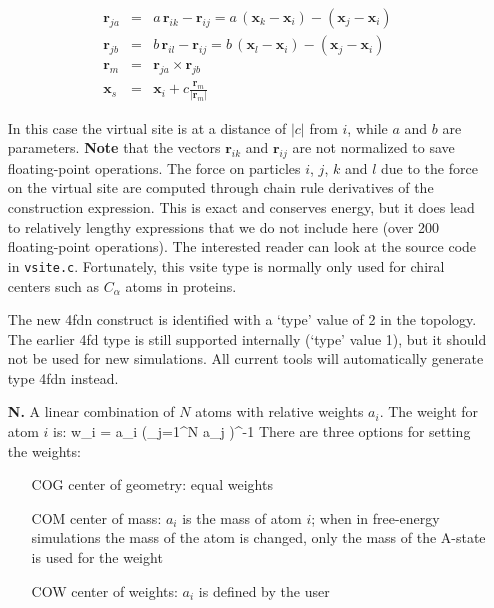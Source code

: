 \begin{itemize}
\begin{eqnarray}
\mathbf{r}_{ja} &=& a\, \mathbf{r}_{ik} - \mathbf{r}_{ij} = a\, (\mathbf{x}_k - \mathbf{x}_i) - (\mathbf{x}_j - \mathbf{x}_i) \nonumber \\
\mathbf{r}_{jb} &=& b\, \mathbf{r}_{il} - \mathbf{r}_{ij} = b\, (\mathbf{x}_l - \mathbf{x}_i) - (\mathbf{x}_j - \mathbf{x}_i) \nonumber \\
\mathbf{r}_m &=& \mathbf{r}_{ja} \times \mathbf{r}_{jb} \nonumber \\
\mathbf{x}_s &=& \mathbf{x}_i + c \frac{\mathbf{r}_m}{|\mathbf{r}_m|}
\label{eq:vsite}
\end{eqnarray}

        In this case the virtual site is at a distance of $|c|$ from $i$, while $a$ and $b$ are 
        parameters. {\bf Note} that the vectors $\mathbf{r}_{ik}$ and $\mathbf{r}_{ij}$ are not normalized
        to save floating-point operations.
        The force on particles $i$, $j$, $k$ and $l$ due to the force 
        on the virtual site are computed through chain rule derivatives
        of the construction expression. This is exact and conserves energy,
        but it does lead to relatively lengthy expressions that we do not
        include here (over 200 floating-point operations). The interested reader can 
        look at the source code in \verb+vsite.c+. Fortunately, this vsite type is normally
        only used for chiral centers such as $C_{\alpha}$ atoms in proteins.
      
The new 4fdn construct is identified with a `type' value of 2 in the topology. The earlier 4fd
type is still supported internally (`type' value 1), but it should not be used for
new simulations. All current {\gromacs} tools will automatically generate type 4fdn instead.


\item[{\bf\sf N.}]\label{subsec:vsiteN} A linear combination of $N$ atoms with relative
weights $a_i$. The weight for atom $i$ is:
\beq
  w_i = a_i \left(\sum_{j=1}^N a_j \right)^{-1}
\eeq
There are three options for setting the weights:
\begin{itemize}
\item[COG] center of geometry: equal weights
\item[COM] center of mass: $a_i$ is the mass of atom $i$;
when in free-energy simulations the mass of the atom is changed,
only the mass of the A-state is used for the weight
\item[COW] center of weights: $a_i$ is defined by the user
\end{itemize}

\end{itemize}

